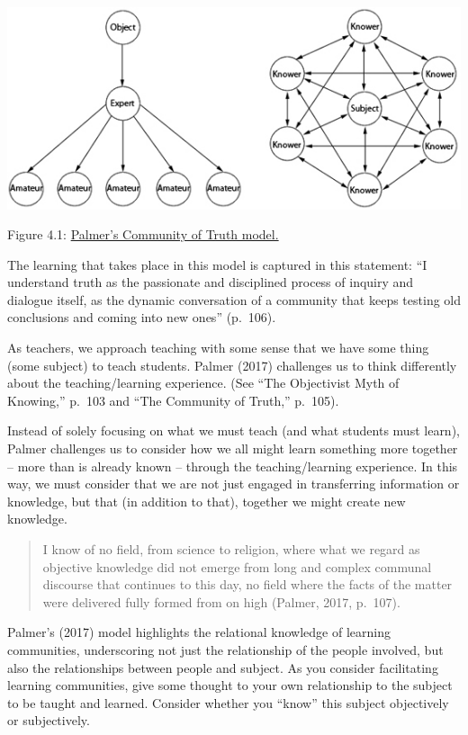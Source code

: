\documentclass[
]{book}
\begin{document}
\includegraphics{assets/unit4/ParkerDiscussion.jpg}

Figure 4.1: \href{https://uncc.instructure.com/courses/342/pages/module-3-why-discussions}{Palmer's Community of Truth model.}

The learning that takes place in this model is captured in this statement: ``I understand truth as the passionate and disciplined process of inquiry and dialogue itself, as the dynamic conversation of a community that keeps testing old conclusions and coming into new ones'' (p.~106).

As teachers, we approach teaching with some sense that we have some thing (some subject) to teach students. Palmer (2017) challenges us to think differently about the teaching/learning experience. (See ``The Objectivist Myth of Knowing,'' p.~103 and ``The Community of Truth,'' p.~105).

Instead of solely focusing on what we must teach (and what students must learn), Palmer challenges us to consider how we all might learn something more together -- more than is already known -- through the teaching/learning experience. In this way, we must consider that we are not just engaged in transferring information or knowledge, but that (in addition to that), together we might create new knowledge.

\begin{quote}
I know of no field, from science to religion, where what we regard as objective knowledge did not emerge from long and complex communal discourse that continues to this day, no field where the facts of the matter were delivered fully formed from on high (Palmer, 2017, p.~107).
\end{quote}

Palmer's (2017) model highlights the relational knowledge of learning communities, underscoring not just the relationship of the people involved, but also the relationships between people and subject. As you consider facilitating learning communities, give some thought to your own relationship to the subject to be taught and learned. Consider whether you ``know'' this subject objectively or subjectively.
\end{document}

